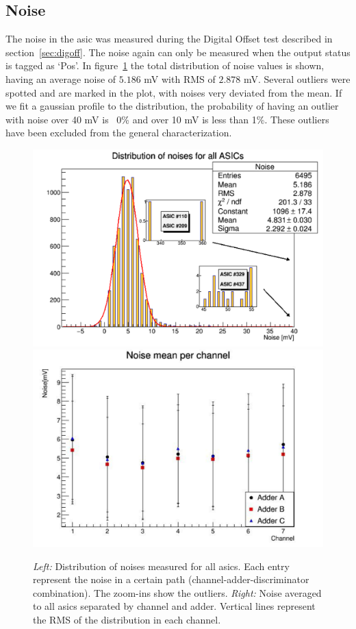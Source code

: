 \documentclass[main.tex]{subfiles}
\begin{document}
\subsection{Noise}

The noise in the \gls{asic} was measured during the Digital Offset test described in section~\ref{sec:digoff}. The noise again can only be measured when the output status is tagged as `Pos'. In figure~\ref{fig:noisedist} the total distribution of noise values is shown, having an average noise of $5.186$ mV with RMS of $2.878$ mV. Several outliers were spotted and are marked in the plot, with noises very deviated from the mean. If we fit a gaussian profile to the distribution, the probability of having an outlier with noise over 40 mV is ~0\% and over 10 mV is less than 1\%. These outliers have been excluded
from the general characterization.
\begin{figure}[h]
  \centering
  \includegraphics[width=\textwidth]{./Pictures/noisedist.pdf}
  \endminipage
  \includegraphics[width=\textwidth]{./Pictures/noisech.pdf}
  \endminipage
  \caption{\textit{Left:} Distribution of noises measured for all \glspl{asic}. Each entry represent the noise in a certain path (channel-adder-discriminator combination). The zoom-ins show the outliers. \textit{Right:} Noise averaged to all \glspl{asic} separated by channel and adder. Vertical lines represent the RMS of the distribution in each channel.}
  \label{fig:noisedist}
\end{figure}
\end{document}
